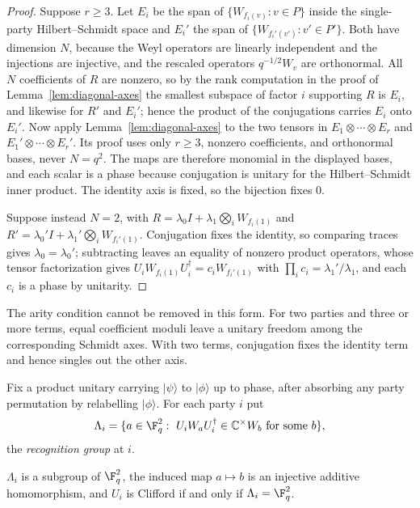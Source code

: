 \begin{proof}
Suppose \(r\geq3\).  Let \(E_i\) be the span of
\(\{W_{f_i(v)}:v\in P\}\) inside the single-party Hilbert--Schmidt space
and \(E_i'\) the span of \(\{W_{f_i'(v')}:v'\in P'\}\).  Both have
dimension \(N\), because the Weyl operators are linearly independent and
the injections are injective, and the rescaled operators
\(q^{-1/2}W_v\) are orthonormal.  All \(N\) coefficients of \(R\) are
nonzero, so by the rank computation in the proof of
Lemma~\ref{lem:diagonal-axes} the smallest subspace of factor \(i\)
supporting \(R\) is \(E_i\), and likewise for \(R'\) and \(E_i'\); hence
the product of the conjugations carries \(E_i\) onto \(E_i'\).  Now apply
Lemma~\ref{lem:diagonal-axes} to the two tensors in
\(E_1\otimes\cdots\otimes E_r\) and \(E_1'\otimes\cdots\otimes E_r'\).
Its proof uses only \(r\geq3\), nonzero coefficients, and orthonormal
bases, never \(N=q^2\).  The maps are therefore monomial in the displayed
bases, and each scalar is a phase because conjugation is unitary for the
Hilbert--Schmidt inner product.  The identity axis is fixed, so the
bijection fixes \(0\).

Suppose instead \(N=2\), with \(R=\lambda_0I+\lambda_1\bigotimes_iW_{f_i(1)}\)
and \(R'=\lambda_0'I+\lambda_1'\bigotimes_iW_{f_i'(1)}\).  Conjugation
fixes the identity, so comparing traces gives \(\lambda_0=\lambda_0'\);
subtracting leaves an equality of nonzero product operators, whose tensor
factorization gives
\(U_iW_{f_i(1)}U_i^\dagger=c_iW_{f_i'(1)}\) with \(\prod_ic_i=\lambda_1'/\lambda_1\),
and each \(c_i\) is a phase by unitarity.
\end{proof}

The arity condition cannot be removed in this form.  For two parties and
three or more terms, equal coefficient moduli leave a unitary freedom among
the corresponding Schmidt axes.  With two terms, conjugation fixes the
identity term and hence singles out the other axis.

Fix a product unitary carrying \(\lvert\psi\rangle\) to \(\lvert\phi\rangle\)
up to phase, after absorbing any party permutation by relabelling
\(\lvert\phi\rangle\).  For each party \(i\) put
\[
 \Lambda_i=\{a\in\F_q^2:\ U_iW_aU_i^\dagger\in\mathbb C^\times W_b
   \text{ for some }b\},
\]
the \emph{recognition group} at \(i\).

\begin{lemma}\label{lem:recognition-group}
\(\Lambda_i\) is a subgroup of \(\F_q^2\), the induced map \(a\mapsto b\)
is an injective additive homomorphism, and \(U_i\) is Clifford if and only
if \(\Lambda_i=\F_q^2\).
\end{lemma}

